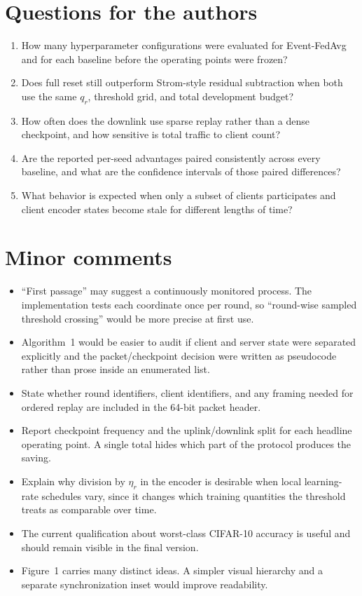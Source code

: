 \documentclass[10pt]{article}
\begin{document}
\section*{Questions for the authors}

\begin{enumerate}
  \item How many hyperparameter configurations were evaluated for
  Event-FedAvg and for each baseline before the operating points were frozen?
  \item Does full reset still outperform Strom-style residual subtraction when
  both use the same $q_r$, threshold grid, and total development budget?
  \item How often does the downlink use sparse replay rather than a dense
  checkpoint, and how sensitive is total traffic to client count?
  \item Are the reported per-seed advantages paired consistently across every
  baseline, and what are the confidence intervals of those paired
  differences?
  \item What behavior is expected when only a subset of clients participates
  and client encoder states become stale for different lengths of time?
\end{enumerate}

\section*{Minor comments}

\begin{itemize}
  \item ``First passage'' may suggest a continuously monitored process. The
  implementation tests each coordinate once per round, so ``round-wise sampled
  threshold crossing'' would be more precise at first use.
  \item Algorithm~1 would be easier to audit if client and server state were
  separated explicitly and the packet/checkpoint decision were written as
  pseudocode rather than prose inside an enumerated list.
  \item State whether round identifiers, client identifiers, and any framing
  needed for ordered replay are included in the 64-bit packet header.
  \item Report checkpoint frequency and the uplink/downlink split for each
  headline operating point. A single total hides which part of the protocol
  produces the saving.
  \item Explain why division by $\eta_r$ in the encoder is desirable when local
  learning-rate schedules vary, since it changes which training quantities the
  threshold treats as comparable over time.
  \item The current qualification about worst-class CIFAR-10 accuracy is useful
  and should remain visible in the final version.
  \item Figure~1 carries many distinct ideas. A simpler visual hierarchy and a
  separate synchronization inset would improve readability.
\end{itemize}
\end{document}
